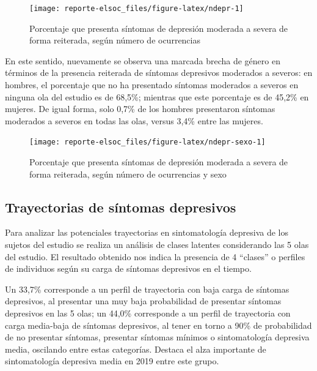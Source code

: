 \documentclass[
  12pt,
]{book}
\begin{document}
\begin{figure}

{\centering \texttt{[image: reporte-elsoc\_files/figure-latex/ndepr-1]} 

}

\caption{Porcentaje que presenta síntomas de depresión moderada a severa de forma reiterada, según número de ocurrencias}\label{fig:ndepr}
\end{figure}

En este sentido, nuevamente se observa una marcada brecha de género en términos de la presencia reiterada de síntomas depresivos moderados a severos: en hombres, el porcentaje que no ha presentado síntomas moderados a severos en ninguna ola del estudio es de 68,5\%; mientras que este porcentaje es de 45,2\% en mujeres. De igual forma, solo 0,7\% de los hombres presentaron síntomas moderados a severos en todas las olas, versus 3,4\% entre las mujeres.

\begin{figure}

{\centering \texttt{[image: reporte-elsoc\_files/figure-latex/ndepr-sexo-1]} 

}

\caption{Porcentaje que presenta síntomas de depresión moderada a severa de forma reiterada, según número de ocurrencias y sexo}\label{fig:ndepr-sexo}
\end{figure}

\hypertarget{trayectorias-de-suxedntomas-depresivos}{%
\subsection*{Trayectorias de síntomas depresivos}\label{trayectorias-de-suxedntomas-depresivos}}

Para analizar las potenciales trayectorias en sintomatología depresiva de los sujetos del estudio se realiza un análisis de clases latentes considerando las 5 olas del estudio. El resultado obtenido nos indica la presencia de 4 ``clases'' o perfiles de individuos según su carga de síntomas depresivos en el tiempo.

Un 33,7\% corresponde a un perfil de trayectoria con baja carga de síntomas depresivos, al presentar una muy baja probabilidad de presentar síntomas depresivos en las 5 olas; un 44,0\% corresponde a un perfil de trayectoria con carga media-baja de síntomas depresivos, al tener en torno a 90\% de probabilidad de no presentar síntomas, presentar síntomas mínimos o sintomatología depresiva media, oscilando entre estas categorías. Destaca el alza importante de sintomatología depresiva media en 2019 entre este grupo.
\end{document}
